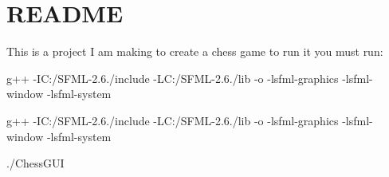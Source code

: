 \chapter{README }
\hypertarget{md__r_e_a_d_m_e}{}\label{md__r_e_a_d_m_e}
This is a project I am making to create a chess game to run it you must run:\+

g++     -\/IC:\+/\+\+SFML-\/2.6./\+include -\/LC:\+/\+\+SFML-\/2.6./\+lib -\/o  -\/lsfml-\/graphics -\/lsfml-\/window -\/lsfml-\/system

g++      -\/IC:\+/\+\+SFML-\/2.6./\+include -\/LC:\+/\+\+SFML-\/2.6./\+lib -\/o  -\/lsfml-\/graphics -\/lsfml-\/window -\/lsfml-\/system

./\+\+Chess\+GUI 